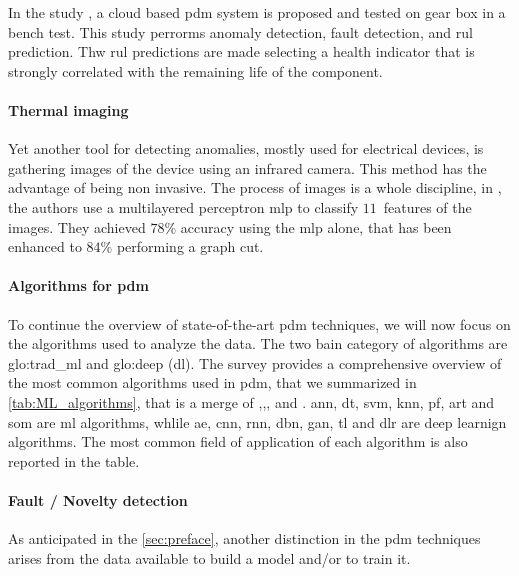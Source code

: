 In the study \cite{calabreseRUL}, a cloud based \gls{pdm} system is proposed and tested on gear box in a bench test. This study perrorms anomaly detection, fault detection, and \gls{rul} prediction. Thw \gls{rul} predictions are made selecting a health indicator that is strongly correlated with the remaining life of the component.


\paragraph{Thermal imaging}
Yet another tool for detecting anomalies, mostly used for electrical devices, is gathering images of the device using an infrared camera. This method has the advantage of being non invasive. The process of images is a whole discipline, in \cite{Thermography}, the authors use a multilayered perceptron \gls{mlp} to classify $11$~features of the images. They achieved $78\%$ accuracy using the \gls{mlp} alone, that has been enhanced to $84\%$ performing a graph cut.

\paragraph{Algorithms for \gls{pdm}}
To continue the overview of state-of-the-art \gls{pdm} techniques, we will now focus on the algorithms used to analyze the data. The two bain category of algorithms are \gls{glo:trad_ml} and \gls{glo:deep} (\gls{dl}).  The survey \cite{ran2019survey} provides a comprehensive overview of the most common algorithms used in \gls{pdm}, that we summarized in \autoref{tab:ML_algorithms}, that is a merge of \cite{ran2019survey},\cite{particlefilter},\cite{yang2018particle},\cite{VONBIRGELEN2018480} and \cite{lira2011adaptive}. \gls{ann}, \gls{dt}, \gls{svm}, \gls{knn}, \gls{pf}, \gls{art} and \gls{som} are \gls{ml} algorithms, whlile \gls{ae}, \gls{cnn}, \gls{rnn}, \gls{dbn}, \gls{gan}, \gls{tl} and \gls{dlr} are deep learnign algorithms. The most common field of application of each algorithm is also reported in the table.



\paragraph*{Fault / Novelty detection}

As anticipated in the \autoref{sec:preface}, another distinction in the \gls{pdm} techniques arises from the data available to build a model and/or to train it.

